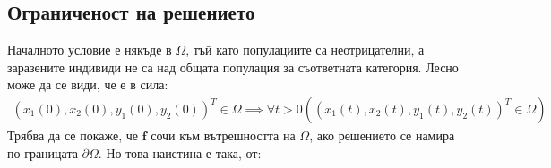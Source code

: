 \subsection{Ограниченост на решението}
Началното условие е някъде в $\Omega$, тъй като популациите са неотрицателни, а заразените индивиди не са над общата популация за съответната категория. Лесно може да се види, че е в сила:
\begin{align}
  (x_1(0), x_2(0), y_1(0), y_2(0))^T \in \Omega \implies \forall{t>0}\left((x_1(t), x_2(t), y_1(t), y_2(t))^T \in \Omega\right)
\end{align}
Трябва да се покаже, че $\mathbf{f}$ сочи към вътрешността на $\Omega$, ако решението се намира по границата $\partial \Omega$. Но това наистина е така, от:

